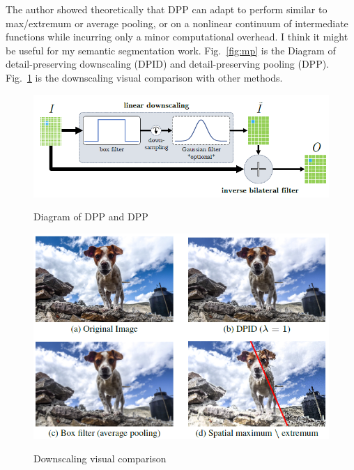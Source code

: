 \documentclass[]{IEEEtran}
\begin{document}
	The author showed theoretically that DPP can adapt to perform similar	to max/extremum or average pooling, or on a nonlinear
	continuum of intermediate functions while incurring only
	a minor computational overhead. I think it might be useful for my semantic segmentation work. Fig.~\ref{fig:mp} is the Diagram of detail-preserving downscaling (DPID) and detail-preserving pooling (DPP). Fig.~\ref{fig:ss} is the downscaling visual comparison with other methods.
	


\newpage
\begin{figure}[!hbt]
		\vspace{1.7cm}
		\begin{center}
			\includegraphics[width=\columnwidth]{t1}
			\caption{Diagram of DPP and DPP}
			\label{fig:mp}
		    \hspace{0.5cm}
			\includegraphics[width=\columnwidth]{t2}
			\caption{Downscaling visual comparison}
			\label{fig:ss}
		\end{center}
	\end{figure}
\end{document}
